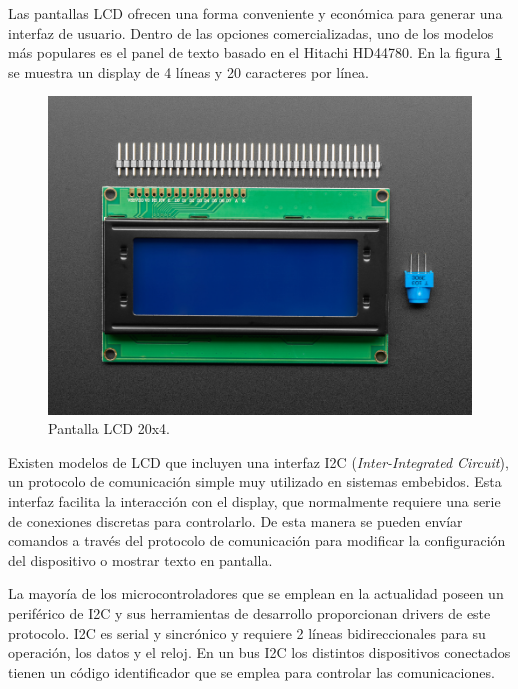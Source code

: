 Las pantallas LCD ofrecen una forma conveniente y económica para generar una interfaz de usuario. Dentro de las opciones comercializadas, uno de los modelos más populares es el panel de texto basado en el Hitachi HD44780\citep{Arduino_Cookbook}. En la figura \ref{fig:Pantalla_LCD} se muestra un display de 4 líneas y 20 caracteres por línea.

\begin{figure}[htbp]
	\centering
	\includegraphics[scale=1.3]{./Figures/LCD.jpg}
	\caption{Pantalla LCD 20x4\protect\footnotemark .}
	\label{fig:Pantalla_LCD}
\end{figure}


Existen modelos de LCD que incluyen una interfaz I2C (\textit{Inter-Integrated Circuit}), un protocolo de comunicación simple muy utilizado en sistemas embebidos. Esta interfaz facilita la interacción con el display, que normalmente requiere una serie de conexiones discretas para controlarlo. De esta manera se pueden envíar comandos a través del protocolo de comunicación para modificar la configuración del dispositivo o mostrar texto en pantalla.

La mayoría de los microcontroladores que se emplean en la actualidad poseen un periférico de I2C y sus herramientas de desarrollo proporcionan drivers de este protocolo. I2C es serial y sincrónico y requiere 2 líneas bidireccionales para su operación, los datos y el reloj. En un bus I2C los distintos dispositivos conectados tienen un código identificador que se emplea para controlar las comunicaciones.

